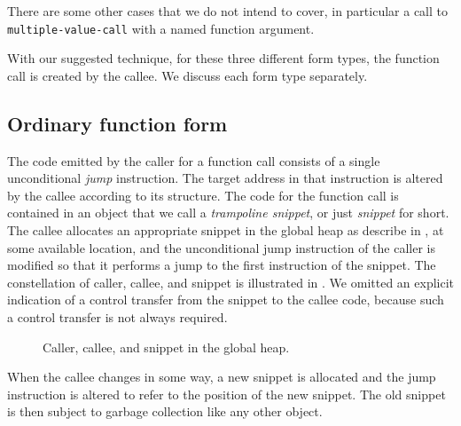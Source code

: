 There are some other cases that we do not intend to cover, in
particular a call to \texttt{multiple-value-call} with a named
function argument.

With our suggested technique, for these three different form types,
the function call is created by the callee.  We discuss each form type
separately.

\subsection{Ordinary function form}

The code emitted by the caller for a function call consists of a
single unconditional \emph{jump} instruction.  The target address in
that instruction is altered by the callee according to its structure.
The code for the function call is contained in an object that we call
a \emph{trampoline snippet}, or just \emph{snippet} for short.  The
callee allocates an appropriate snippet in the global heap as describe
in , at some available location, and the
unconditional jump instruction of the caller is modified so that it
performs a jump to the first instruction of the snippet.  The
constellation of caller, callee, and snippet is illustrated in
.  We omitted an explicit indication of a control
transfer from the snippet to the callee code, because such a control
transfer is not always required.

\begin{figure}
\begin{center}
\end{center}
\caption{\label{fig-snippet}
Caller, callee, and snippet in the global heap.}
\end{figure}

When the callee changes in some way, a
new snippet is allocated and the jump instruction is altered to refer
to the position of the new snippet.  The old snippet is then subject
to garbage collection like any other object.


